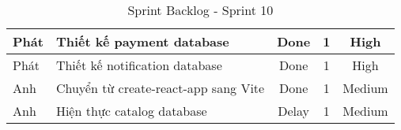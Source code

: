 \begin{table}[H]
\begin{tabular}{|m{2.5cm}|m{6cm}|c|c|c|}
    Phát              & Thiết kế payment database                    & Done            & 1                   & High         \\ \hline
    Phát              & Thiết kế notification database                   & Done            & 1                   & High         \\ \hline
    Anh               & Chuyển từ create-react-app sang Vite                   & Done            & 1                   & Medium         \\ \hline
    Anh               & Hiện thực catalog database                   & Delay            & 1                   & Medium         \\ \hline
    \end{tabular}
    \caption{Sprint Backlog - Sprint 10}
    \label{tab:sprint-10}
\end{table}
